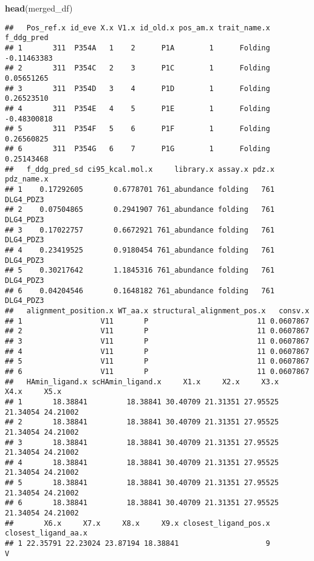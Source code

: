 \documentclass[
]{article}
\newenvironment{Shaded}{\begin{snugshade}}{\end{snugshade}}
\newcommand{\FunctionTok}[1]{\textcolor[rgb]{0.13,0.29,0.53}{\textbf{#1}}}
\newcommand{\NormalTok}[1]{#1}
\begin{document}
\begin{Shaded}
\begin{Highlighting}[]
\FunctionTok{head}\NormalTok{(merged\_df)}
\end{Highlighting}
\end{Shaded}

\begin{verbatim}
##   Pos_ref.x id_eve X.x V1.x id_old.x pos_am.x trait_name.x  f_ddg_pred
## 1       311  P354A   1    2      P1A        1      Folding -0.11463383
## 2       311  P354C   2    3      P1C        1      Folding  0.05651265
## 3       311  P354D   3    4      P1D        1      Folding  0.26523510
## 4       311  P354E   4    5      P1E        1      Folding -0.48300818
## 5       311  P354F   5    6      P1F        1      Folding  0.26560825
## 6       311  P354G   6    7      P1G        1      Folding  0.25143468
##   f_ddg_pred_sd ci95_kcal.mol.x     library.x assay.x pdz.x pdz_name.x
## 1    0.17292605       0.6778701 761_abundance folding   761  DLG4_PDZ3
## 2    0.07504865       0.2941907 761_abundance folding   761  DLG4_PDZ3
## 3    0.17022757       0.6672921 761_abundance folding   761  DLG4_PDZ3
## 4    0.23419525       0.9180454 761_abundance folding   761  DLG4_PDZ3
## 5    0.30217642       1.1845316 761_abundance folding   761  DLG4_PDZ3
## 6    0.04204546       0.1648182 761_abundance folding   761  DLG4_PDZ3
##   alignment_position.x WT_aa.x structural_alignment_pos.x   consv.x
## 1                  V11       P                         11 0.0607867
## 2                  V11       P                         11 0.0607867
## 3                  V11       P                         11 0.0607867
## 4                  V11       P                         11 0.0607867
## 5                  V11       P                         11 0.0607867
## 6                  V11       P                         11 0.0607867
##   HAmin_ligand.x scHAmin_ligand.x     X1.x     X2.x     X3.x     X4.x     X5.x
## 1       18.38841         18.38841 30.40709 21.31351 27.95525 21.34054 24.21002
## 2       18.38841         18.38841 30.40709 21.31351 27.95525 21.34054 24.21002
## 3       18.38841         18.38841 30.40709 21.31351 27.95525 21.34054 24.21002
## 4       18.38841         18.38841 30.40709 21.31351 27.95525 21.34054 24.21002
## 5       18.38841         18.38841 30.40709 21.31351 27.95525 21.34054 24.21002
## 6       18.38841         18.38841 30.40709 21.31351 27.95525 21.34054 24.21002
##       X6.x     X7.x     X8.x     X9.x closest_ligand_pos.x closest_ligand_aa.x
## 1 22.35791 22.23024 23.87194 18.38841                    9                   V

\end{verbatim}
\end{document}
